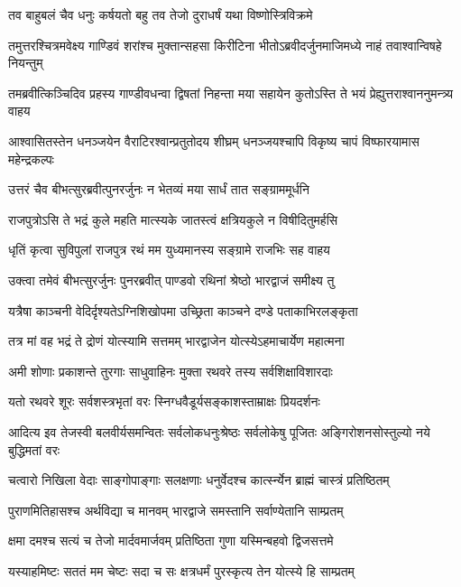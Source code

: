 \twolineshloka
{तव बाहुबलं चैव धनुः कर्षयतो बहु}
{तव तेजो दुराधर्षं यथा विष्णोस्त्रिविक्रमे}



\twolineshloka
{तमुत्तरश्चित्रमवेक्ष्य गाण्डिवं शरांश्च मुक्तान्सहसा किरीटिना}
{भीतोऽब्रवीदर्जुनमाजिमध्ये नाहं तवाश्वान्विषहे नियन्तुम्}


\twolineshloka
{तमब्रवीत्किञ्चिदिव प्रहस्य गाण्डीवधन्वा द्विषतां निहन्ता}
{मया सहायेन कुतोऽस्ति ते भयं प्रेह्युत्तराश्वाननुमन्त्र्य वाहय}



\twolineshloka
{आश्वासितस्तेन धनञ्जयेन वैराटिरश्वान्प्रतुतोदय शीघ्रम्}
{धनञ्जयश्चापि विकृष्य चापं विष्फारयामास महेन्द्रकल्पः}


\twolineshloka
{उत्तरं चैव बीभत्सुरब्रवीत्पुनरर्जुनः}
{न भेतव्यं मया सार्धं तात सङ्ग्राममूर्धनि}


\twolineshloka
{राजपुत्रोऽसि ते भद्रं कुले महति मात्स्यके}
{जातस्त्वं क्षत्रियकुले न विषीदितुमर्हसि}


\twolineshloka
{धृतिं कृत्वा सुविपुलां राजपुत्र रथं मम}
{युध्यमानस्य सङ्ग्रामे राजभिः सह वाहय}


\twolineshloka
{उक्त्वा तमेवं बीभत्सुरर्जुनः पुनरब्रवीत्}
{पाण्डवो रथिनां श्रेष्ठो भारद्वाजं समीक्ष्य तु}


\twolineshloka
{यत्रैषा काञ्चनी वेदिर्दृश्यतेऽग्निशिखोपमा}
{उच्छ्रिता काञ्चने दण्डे पताकाभिरलङ्कृता}


\twolineshloka
{तत्र मां वह भद्रं ते द्रोणं योत्स्यामि सत्तमम्}
{भारद्वाजेन योत्स्येऽहमाचार्येण महात्मना}


\twolineshloka
{अमी शोणाः प्रकाशन्ते तुरगाः साधुवाहिनः}
{मुक्ता रथवरे तस्य सर्वशिक्षाविशारदाः}


\twolineshloka
{यतो रथवरे शूरः सर्वशस्त्रभृतां वरः}
{स्निग्धवैडूर्यसङ्काशस्ताम्राक्षः प्रियदर्शनः}


\threelineshloka
{आदित्य इव तेजस्वी बलवीर्यसमन्वितः}
{सर्वलोकधनुःश्रेष्ठः सर्वलोकेषु पूजितः}
{अङ्गिरोशनसोस्तुल्यो नये बुद्धिमतां वरः}


\twolineshloka
{चत्वारो निखिला वेदाः साङ्गोपाङ्गाः सलक्षणाः}
{धनुर्वेदश्च कार्त्स्न्येन ब्राह्मं चास्त्रं प्रतिष्ठितम्}


\twolineshloka
{पुराणमितिहासश्च अर्थविद्या च मानवम्}
{भारद्वाजे समस्तानि सर्वाण्येतानि साम्प्रतम्}


\twolineshloka
{क्षमा दमश्च सत्यं च तेजो मार्दवमार्जवम्}
{प्रतिष्ठिता गुणा यस्मिन्बहवो द्विजसत्तमे}


\twolineshloka
{यस्याहमिष्टः सततं मम चेष्टः सदा च सः}
{क्षत्रधर्मं पुरस्कृत्य तेन योत्स्ये हि साम्प्रतम्}



